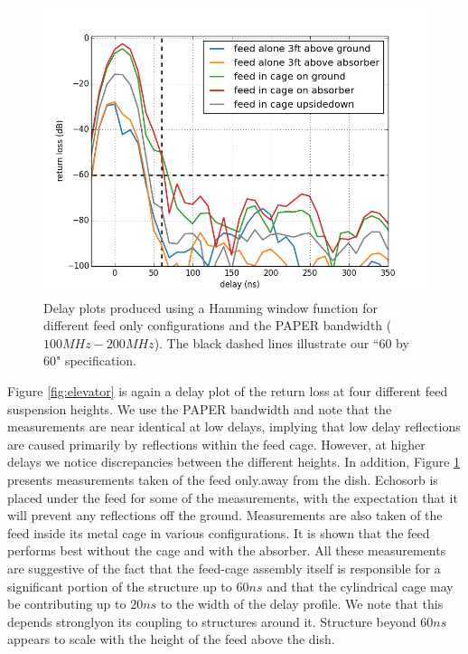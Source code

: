 \documentclass[twocolumn]{emulateapj}
\begin{document}
\begin{figure}[H]
\centering
\includegraphics[width=\linewidth]{plots/delay_feed.png}
\caption{Delay plots produced using a Hamming window function for different feed only configurations and the PAPER bandwidth ($100MHz-200MHz$). The black dashed lines illustrate our ``60 by 60" specification.}
\label{fig:outofthedish}
\end{figure}

Figure \ref{fig:elevator} is again a delay plot of the return loss at four different feed suspension heights. 
We use the PAPER bandwidth and note
that the measurements are near identical at low delays, implying that low delay reflections are caused primarily by reflections within the feed cage. 
However, at higher delays we notice discrepancies between the different heights.
In addition, Figure \ref{fig:outofthedish} presents measurements taken of the feed only.away from the dish. Echosorb is placed under the feed for some of the
measurements, with the expectation that it will prevent any reflections off the
ground.
 Measurements are also taken of the feed inside its metal cage in various configurations. It is shown that the feed performs best without the cage and with the absorber. 
All these measurements are suggestive of the  fact that the feed-cage assembly itself is responsible for a significant portion of the structure up to $60ns$ and
that the cylindrical cage may be contributing up to $20ns$ to the width of the delay profile. 
We note that this depends stronglyon its coupling to structures around it. 
Structure beyond $60ns$ appears to scale with the height of the feed above the dish.
\end{document}

